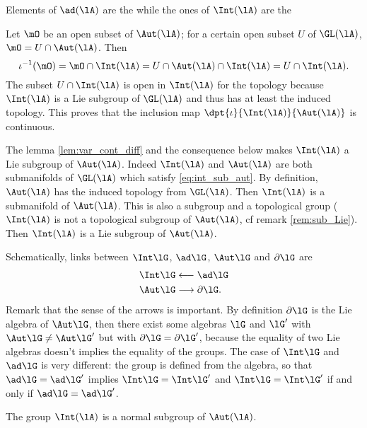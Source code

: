 Elements of $\ad(\lA)$ are the  while the ones of $\Int(\lA)$ are the  

Let $\mO$ be an open subset of $\Aut(\lA)$; for a certain open subset $U$ of $\GL(\lA)$, $\mO=U\cap\Aut(\lA)$. Then
\begin{equation}
  \iota^{-1}(\mO)=\mO\cap\Int(\lA)
           =U\cap\Aut(\lA)\cap\Int(\lA)
       =U\cap\Int(\lA).
\end{equation}
The subset $U\cap\Int(\lA)$ is open in $\Int(\lA)$ for the topology because $\Int(\lA)$ is a Lie subgroup of $\GL(\lA)$ and thus has at least the induced topology. This proves that the inclusion map $\dpt{\iota}{\Int(\lA)}{\Aut(\lA)}$ is continuous.

The lemma \ref{lem:var_cont_diff} and the consequence below makes $\Int(\lA)$ a Lie subgroup of $\Aut(\lA)$. Indeed $\Int(\lA)$ and $\Aut(\lA)$ are both submanifolds of $\GL(\lA)$ which satisfy \eqref{eq:int_sub_aut}. By definition, $\Aut(\lA)$ has the induced topology from $\GL(\lA)$. Then $\Int(\lA)$ is a submanifold of $\Aut(\lA)$. This is also a subgroup and a topological group ($\Int(\lA)$ is not a topological subgroup of $\Aut(\lA)$, cf remark \ref{rem:sub_Lie}). Then $\Int(\lA)$ is a Lie subgroup of $\Aut(\lA)$.


Schematically, links between $\Int\lG$, $\ad\lG$, $\Aut\lG$ and $\partial\lG$ are
\begin{subequations}\label{eq:schem_ad_int}
\begin{align}
  \Int\lG&\longleftarrow\ad\lG\\
  \Aut\lG&\longrightarrow\partial\lG.
\end{align}
\end{subequations}
Remark that the sense of the arrows is important. By definition $\partial\lG$ is the Lie algebra of $\Aut\lG$, then there exist some algebras $\lG$ and $\lG'$ with $\Aut\lG\neq\Aut\lG'$ but with $\partial\lG=\partial\lG'$, because the equality of two Lie algebras doesn't implies the equality of the groups. The case of $\Int\lG$ and $\ad\lG$ is very different: the group is defined from the algebra, so that $\ad\lG=\ad\lG'$ implies $\Int\lG=\Int\lG'$ and $\Int\lG=\Int\lG'$ if and only if $\ad\lG=\ad\lG'$.


\begin{proposition}
 The group $\Int(\lA)$ is a normal subgroup of $\Aut(\lA)$.
\end{proposition}

